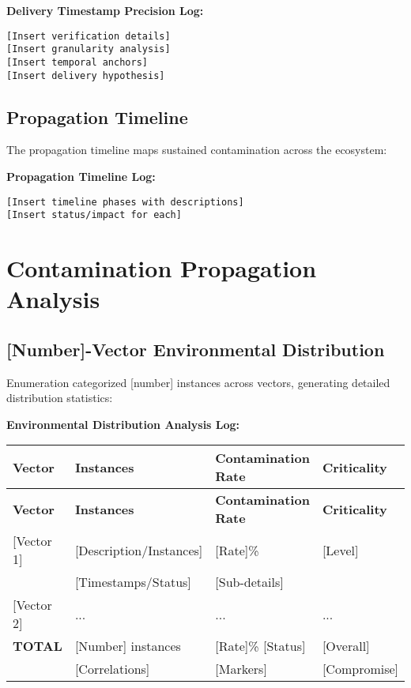 \documentclass[12pt,a4paper]{article}
\begin{document}
\textbf{Delivery Timestamp Precision Log:}
\begin{lstlisting}[style=terminal, caption={[Precision] Timestamp Precision Analysis}]
[Insert verification details]
[Insert granularity analysis]
[Insert temporal anchors]
[Insert delivery hypothesis]
\end{lstlisting}

\subsection{Propagation Timeline}
The propagation timeline maps sustained contamination across the ecosystem:

\textbf{Propagation Timeline Log:}
\begin{lstlisting}[style=terminal, caption={Sustained [Timeline] Chronology}]
[Insert timeline phases with descriptions]
[Insert status/impact for each]
\end{lstlisting}

\newpage

\section{Contamination Propagation Analysis}

\subsection{[Number]-Vector Environmental Distribution}
Enumeration categorized [number] instances across vectors, generating detailed distribution statistics:

\textbf{Environmental Distribution Analysis Log:}
\begin{longtable}{|p{3cm}|p{4cm}|p{3cm}|p{3cm}|}
\hline
\textbf{Vector} & \textbf{Instances} & \textbf{Contamination Rate} & \textbf{Criticality} \\
\hline
\endfirsthead

\hline
\textbf{Vector} & \textbf{Instances} & \textbf{Contamination Rate} & \textbf{Criticality} \\
\hline
\endhead

[Vector 1] & [Description/Instances] & [Rate]\% & [Level] \\
[Details] & [Timestamps/Status] & [Sub-details] & \\
\hline

[Vector 2] & ... & ... & ... \\
\hline

\textbf{TOTAL} & [Number] instances & [Rate]\% [Status] & [Overall] \\
[Summary] & [Correlations] & [Markers] & [Compromise] \\
\hline
\end{longtable}
\end{document}
